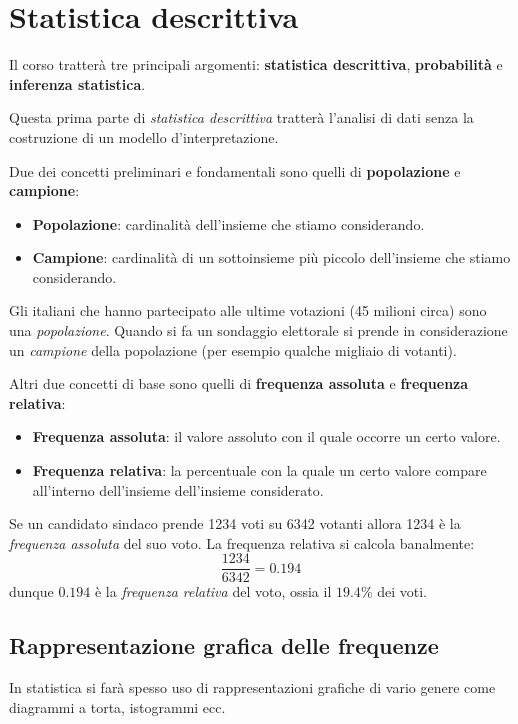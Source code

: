 \chapter{Statistica descrittiva}

Il corso tratterà tre principali argomenti: \textbf{statistica descrittiva}, \textbf{probabilità} e
\textbf{inferenza statistica}.

Questa prima parte di \emph{statistica descrittiva} tratterà l'analisi di dati senza la costruzione di un
modello d'interpretazione.

Due dei concetti preliminari e fondamentali sono quelli di \textbf{popolazione} e \textbf{campione}:
\begin{itemize}
	\item \textbf{Popolazione}: cardinalità dell'insieme che stiamo considerando.
	\item \textbf{Campione}: cardinalità di un sottoinsieme più piccolo dell'insieme che stiamo considerando.
\end{itemize}

\begin{example}
	Gli italiani che hanno partecipato alle ultime votazioni (45 milioni circa) sono una \emph{popolazione}.
	Quando si fa un sondaggio elettorale si prende in considerazione un \emph{campione} della popolazione (per
	esempio qualche migliaio di votanti).
\end{example}

Altri due concetti di base sono quelli di \textbf{frequenza assoluta} e \textbf{frequenza relativa}:
\begin{itemize}
	\item \textbf{Frequenza assoluta}: il valore assoluto con il quale occorre un certo valore.
	\item \textbf{Frequenza relativa}: la percentuale con la quale un certo valore compare all'interno
	      dell'insieme dell'insieme considerato.
\end{itemize}

\begin{example}
	Se un candidato sindaco prende 1234 voti su 6342 votanti allora 1234 è la \emph{frequenza assoluta} del
	suo voto. La frequenza relativa si calcola banalmente:
	\[ \frac{1234}{6342} = 0.194 \]
	dunque $0.194$ è la \emph{frequenza relativa} del voto, ossia il $19.4 \%$ dei voti.
\end{example}

\section{Rappresentazione grafica delle frequenze}
In statistica si farà spesso uso di rappresentazioni grafiche di vario genere come diagrammi a torta, istogrammi
ecc.

